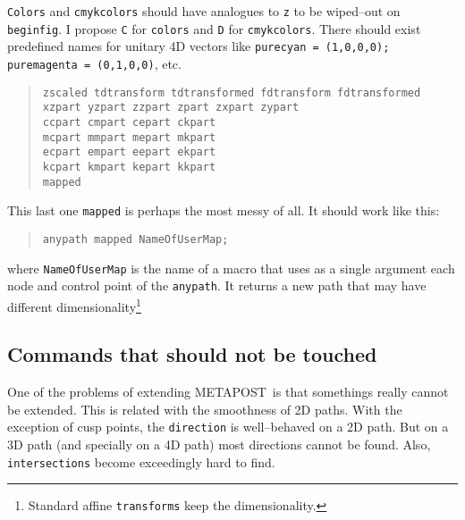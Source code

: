 \documentclass{article}
\newcommand{\MP}{{\normald METAPOST}}
\begin{document}
{\tt Colors} and {\tt cmykcolors} should have analogues to {\tt z} to
be wiped--out on {\tt beginfig}. I propose {\tt C} for {\tt colors}
and {\tt D} for {\tt cmykcolors}. There should exist predefined names for
unitary 4D vectors like {\tt purecyan = (1,0,0,0); puremagenta =
  (0,1,0,0)}, etc. 
\begin{quote}
\begin{verbatim}
zscaled tdtransform tdtransformed fdtransform fdtransformed
xzpart yzpart zzpart zpart zxpart zypart
ccpart cmpart cepart ckpart
mcpart mmpart mepart mkpart
ecpart empart eepart ekpart
kcpart kmpart kepart kkpart
mapped
\end{verbatim}
\end{quote}
This last one {\tt mapped} is perhaps the most messy of all. It should
work like this:
\begin{quote}
\begin{verbatim}
anypath mapped NameOfUserMap;
\end{verbatim}
\end{quote}
where {\tt NameOfUserMap} is the name of a macro that uses as a single
argument each node and control point of the {\tt anypath}. It returns
a new path that may have different dimensionality\footnote{Standard
  affine {\tt transforms} keep the dimensionality.} 

\subsection{Commands that should not be touched}

One of the problems of extending \MP\ is that somethings really cannot
be extended. This is related with the smoothness of 2D paths. With the
exception of cusp points, the {\tt direction} is well--behaved on a 2D
path. But on a 3D path (and specially on a 4D path) most directions
cannot be found. Also, {\tt intersections} become exceedingly hard to
find. 
\end{document}
